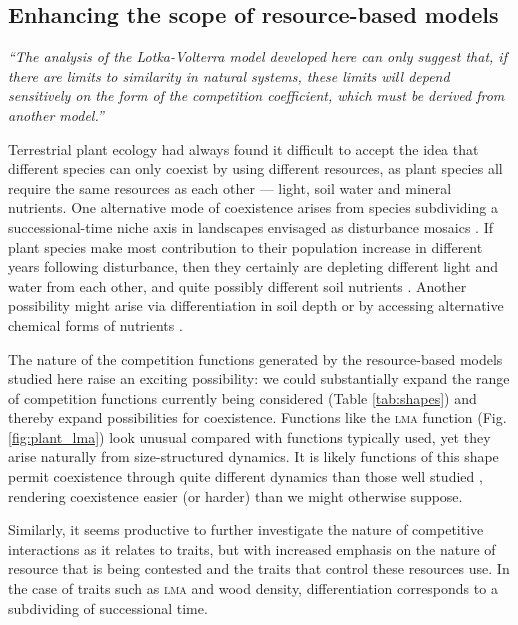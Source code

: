 \documentclass[a4paper,11pt]{article}
\begin{document}
\subsection{Enhancing the scope of resource-based models}

\emph{``The analysis of the Lotka-Volterra model developed here can only suggest that, if there are limits to similarity in natural systems, these limits will depend sensitively on the form of the competition coefficient,
which must be derived from another model.''}\citep{Abrams-1975}

Terrestrial plant ecology had always found it difficult to accept the idea that different species can only coexist by using different resources, as plant species all require the same resources as each other ---
light, soil water and mineral nutrients. One alternative mode of coexistence arises from species subdividing a successional-time niche axis in landscapes envisaged as disturbance mosaics \citep{Connell-1978}. If plant species make most contribution to their population increase in different years following disturbance, then they certainly are depleting different light and water from each other, and quite possibly different soil nutrients \citep{Moorcroft-2001}. Another possibility might arise via differentiation in soil depth or by accessing alternative chemical forms of nutrients \citep{Tilman-1977}.

The nature of the competition functions generated by the resource-based models studied here raise an exciting possibility: we could substantially expand the range of competition functions currently being considered (Table \ref{tab:shapes}) and thereby expand possibilities for coexistence. Functions like the \textsc {lma} function
(Fig. \ref{fig:plant_lma}) look unusual compared with functions typically used, yet they arise naturally from size-structured dynamics.
It is likely functions of this shape permit coexistence through quite different dynamics than those well studied
\citep[e.g.][]{Leimar-2013}, rendering coexistence easier (or harder)
than we might otherwise suppose.

Similarly, it seems productive to further investigate the nature of competitive interactions as it relates to traits, but with increased emphasis on the nature of resource that is being contested and the traits that control these resources use. In the case of traits such as \textsc{lma} and wood density, differentiation corresponds to a subdividing of successional time.
\end{document}
